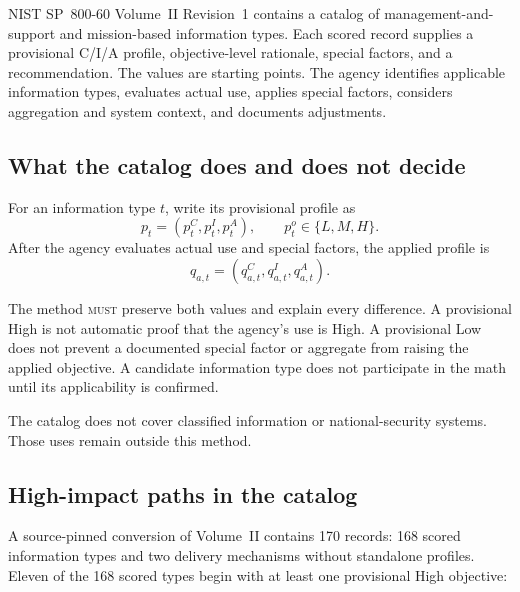 \documentclass[11pt]{article}
\newcommand{\rfckw}[1]{\textsc{#1}}
\begin{document}
NIST SP~800-60 Volume~II Revision~1 contains a catalog of management-and-support
and mission-based information types. Each scored record supplies a provisional
C/I/A profile, objective-level rationale, special factors, and a recommendation.
The values are starting points. The agency identifies applicable information
types, evaluates actual use, applies special factors, considers aggregation and
system context, and documents adjustments.

\subsection{What the catalog does and does not decide}

For an information type $t$, write its provisional profile as
\[
p_t=(p_t^C,p_t^I,p_t^A), \qquad p_t^o\in\{L,M,H\}.
\]
After the agency evaluates actual use and special factors, the applied profile is
\[
q_{a,t}=(q_{a,t}^C,q_{a,t}^I,q_{a,t}^A).
\]

The method \rfckw{must} preserve both values and explain every difference. A
provisional High is not automatic proof that the agency's use is High. A
provisional Low does not prevent a documented special factor or aggregate from
raising the applied objective. A candidate information type does not participate
in the math until its applicability is confirmed.

The catalog does not cover classified information or national-security systems.
Those uses remain outside this method.

\subsection{High-impact paths in the catalog}

A source-pinned conversion of Volume~II contains 170 records: 168 scored
information types and two delivery mechanisms without standalone profiles. Eleven
of the 168 scored types begin with at least one provisional High objective:
\end{document}
